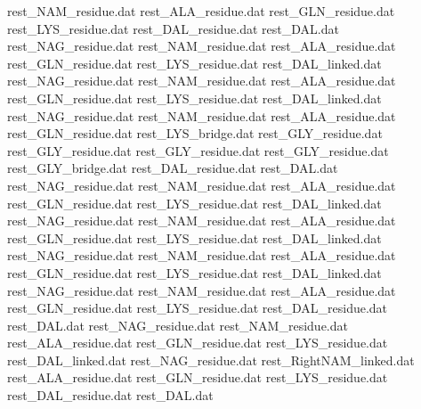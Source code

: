 rest_NAM_residue.dat            
rest_ALA_residue.dat            
rest_GLN_residue.dat            
rest_LYS_residue.dat            
rest_DAL_residue.dat            
rest_DAL.dat                    
rest_NAG_residue.dat            
rest_NAM_residue.dat            
rest_ALA_residue.dat            
rest_GLN_residue.dat            
rest_LYS_residue.dat            
rest_DAL_linked.dat             
rest_NAG_residue.dat            
rest_NAM_residue.dat            
rest_ALA_residue.dat            
rest_GLN_residue.dat            
rest_LYS_residue.dat            
rest_DAL_linked.dat             
rest_NAG_residue.dat            
rest_NAM_residue.dat            
rest_ALA_residue.dat            
rest_GLN_residue.dat            
rest_LYS_bridge.dat             
rest_GLY_residue.dat
rest_GLY_residue.dat
rest_GLY_residue.dat
rest_GLY_residue.dat
rest_GLY_bridge.dat
rest_DAL_residue.dat            
rest_DAL.dat                    
rest_NAG_residue.dat            
rest_NAM_residue.dat            
rest_ALA_residue.dat            
rest_GLN_residue.dat            
rest_LYS_residue.dat            
rest_DAL_linked.dat             
rest_NAG_residue.dat            
rest_NAM_residue.dat            
rest_ALA_residue.dat            
rest_GLN_residue.dat            
rest_LYS_residue.dat            
rest_DAL_linked.dat             
rest_NAG_residue.dat            
rest_NAM_residue.dat            
rest_ALA_residue.dat            
rest_GLN_residue.dat            
rest_LYS_residue.dat            
rest_DAL_linked.dat             
rest_NAG_residue.dat            
rest_NAM_residue.dat            
rest_ALA_residue.dat            
rest_GLN_residue.dat            
rest_LYS_residue.dat            
rest_DAL_residue.dat            
rest_DAL.dat                    
rest_NAG_residue.dat            
rest_NAM_residue.dat            
rest_ALA_residue.dat            
rest_GLN_residue.dat            
rest_LYS_residue.dat            
rest_DAL_linked.dat             
rest_NAG_residue.dat            
rest_RightNAM_linked.dat        
rest_ALA_residue.dat            
rest_GLN_residue.dat            
rest_LYS_residue.dat            
rest_DAL_residue.dat            
rest_DAL.dat                    
